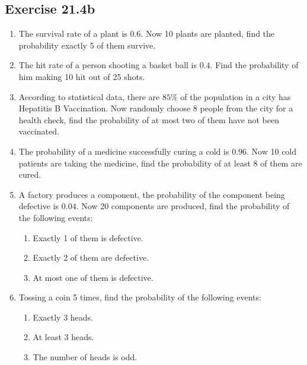\documentclass{report}
\begin{document}
\begin{multicols}{2}
  \subsection{Exercise 21.4b}

  \begin{enumerate}
    \item The survival rate of a plant is $0.6$. Now 10 plants are planted, find the
          probability exactly 5 of them survive.

    \item The hit rate of a person shooting a basket ball is $0.4$. Find the probability
          of him making 10 hit out of 25 shots.

    \item According to statistical data, there are $85\%$ of the population in a city has
          Hepatitis B Vaccination. Now randomly choose 8 people from the city for a
          health check, find the probability of at most two of them have not been
          vaccinated.

    \item The probability of a medicine successfully curing a cold is $0.96$. Now 10 cold
          patients are taking the medicine, find the probability of at least 8 of them
          are cured.

    \item A factory produces a component, the probability of the component being
          defective is $0.04$. Now 20 components are produced, find the probability of
          the following events:
          \begin{enumerate}
            \item Exactly 1 of them is defective.
            \item Exactly 2 of them are defective.
            \item At most one of them is defective.
          \end{enumerate}

    \item Tossing a coin 5 times, find the probability of the following events:
          \begin{enumerate}
            \item Exactly 3 heads.
            \item At least 3 heads.
            \item The number of heads is odd.
          \end{enumerate}


\end{enumerate}
\end{multicols}
\end{document}
